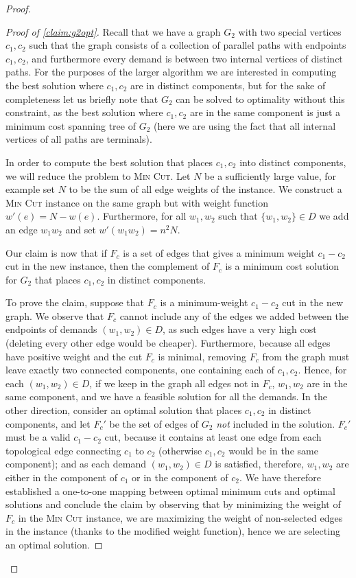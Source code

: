\begin{proof}
\begin{proof}[Proof of \cref{claim:g2opt}]
Recall that we have a graph $G_2$ with two special vertices $c_1,c_2$ such that
the graph consists of a collection of parallel paths with endpoints $c_1,c_2$,
and furthermore every demand is between two internal vertices of distinct
paths. For the purposes of the larger algorithm we are interested in computing
the best solution where $c_1,c_2$ are in distinct components, but for the sake
of completeness let us briefly note that $G_2$ can be solved to optimality
without this constraint, as the best solution where $c_1,c_2$ are in the same
component is just a minimum cost spanning tree of $G_2$ (here we are using the
fact that all internal vertices of all paths are terminals).

In order to compute the best solution that places $c_1,c_2$ into distinct
components, we will reduce the problem to \textsc{Min Cut}. Let $N$ be a
sufficiently large value, for example set $N$ to be the sum of all edge weights
of the instance. We construct a \textsc{Min Cut} instance on the same graph but
with weight function $w'(e)=N-w(e)$. Furthermore, for all $w_1,w_2$ such that
$\{w_1,w_2\}\in D$ we add an edge $w_1w_2$ and set $w'(w_1w_2)=n^2N$.

Our claim is now that if $F_c$ is a set of edges that gives a minimum weight
$c_1-c_2$ cut in the new instance, then the complement of $F_c$ is a minimum
cost \SF solution for $G_2$ that places $c_1,c_2$ in distinct components.

To prove the claim, suppose that $F_c$ is a minimum-weight $c_1-c_2$ cut in the
new graph. We observe that $F_c$ cannot include any of the edges we added
between the endpoints of demands $(w_1,w_2)\in D$, as such edges have a very
high cost (deleting every other edge would be cheaper). Furthermore, because
all edges have positive weight and the cut $F_c$ is minimal, removing $F_c$
from the graph must leave exactly two connected components, one containing each
of $c_1,c_2$. Hence, for each $(w_1,w_2)\in D$, if we keep in the graph all
edges not in $F_c$, $w_1,w_2$ are in the same component, and we have a feasible
\SF solution for all the demands. In the other direction, consider an optimal
\SF solution that places $c_1,c_2$ in distinct components, and let $F_c'$ be
the set of edges of $G_2$ \emph{not} included in the solution. $F_c'$ must be a
valid $c_1-c_2$ cut, because it contains at least one edge from each
topological edge connecting $c_1$ to $c_2$ (otherwise $c_1,c_2$ would be in the
same component); and as each demand $(w_1,w_2)\in D$ is satisfied, therefore,
$w_1,w_2$ are either in the component of $c_1$ or in the component of $c_2$. We
have therefore established a one-to-one mapping between optimal minimum cuts
and optimal \SF solutions and conclude the claim by observing that by
minimizing the weight of $F_c$ in the \textsc{Min Cut} instance, we are
maximizing the weight of non-selected edges in the \SF instance (thanks to the
modified weight function), hence we are selecting an optimal \SF solution.
\end{proof}
%

\end{proof}

